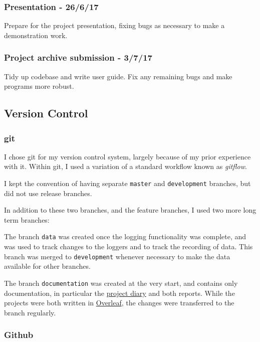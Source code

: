 \documentclass[a4paper]{article}
\begin{document}
\subsubsection{Presentation - 26/6/17}

Prepare for the project presentation, fixing bugs as necessary to make a demonstration work. 

\subsubsection{Project archive submission - 3/7/17}

Tidy up codebase and write user guide. Fix any remaining bugs and make programs more robust.

\subsection{Version Control}%
\label{subsec:pp_vc}

\subsubsection{git}

I chose git\cite{ppref0} for my version control system, largely because of my prior experience with it. Within git, I used a variation of a standard workflow known as \textit{gitflow}.\cite{ppref1} 

I kept the convention of having separate \lstinline{master} and \lstinline{development} branches, but did not use release branches. 

In addition to these two branches, and the feature branches, I used two more long term branches:

The branch \lstinline{data} was created once the logging functionality was complete, and was used to track changes to the loggers and to track the recording of data. This branch was merged to \lstinline{development} whenever necessary to make the data available for other branches.

The branch \lstinline{documentation} was created at the very start, and contains only documentation, in particular the \hyperref[subsec:a3_pd]{project diary} and both reports. While the projects were both written in \hyperref[subsubsec:pp_ts_overleaf]{Overleaf}, the changes were transferred to the branch regularly.

\subsubsection{Github}
\end{document}
